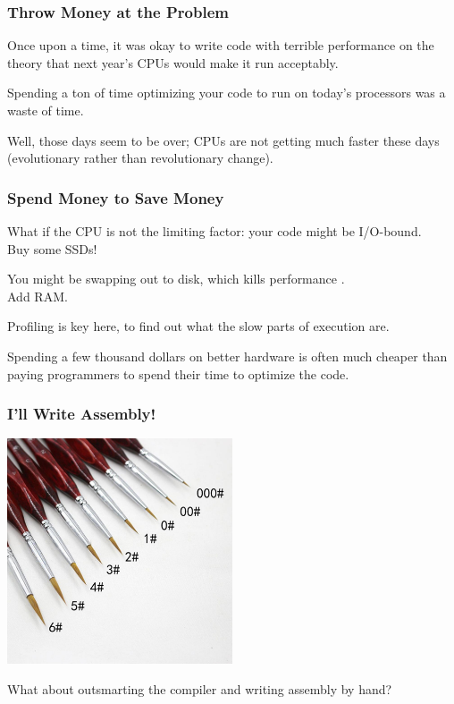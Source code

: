 \begin{frame}
\frametitle{Throw Money at the Problem}

Once upon a time, it was okay to write code with terrible performance on the theory that next year's CPUs would make it run acceptably. 

Spending a ton of time optimizing your code to run on today's processors was a waste of time. 

Well, those days seem to be over; CPUs are not getting much faster these days (evolutionary rather than revolutionary change). 

\end{frame}



\begin{frame}
\frametitle{Spend Money to Save Money}

What if the CPU is not the limiting factor: your code might be I/O-bound.\\
\quad Buy some SSDs! 

You might be swapping out to disk, which kills performance .\\
\quad Add RAM. 

Profiling is key here, to find out what the slow parts of execution are. 

Spending a few thousand dollars on better hardware is often much cheaper than paying programmers to spend their time to optimize the code.


\end{frame}


\begin{frame}
\frametitle{I'll Write Assembly!}

\begin{center}
	\includegraphics[width=0.5\textwidth]{images/miniature-paintbrush.jpg}
\end{center}

What about outsmarting the compiler and writing assembly by hand? 

\end{frame}



